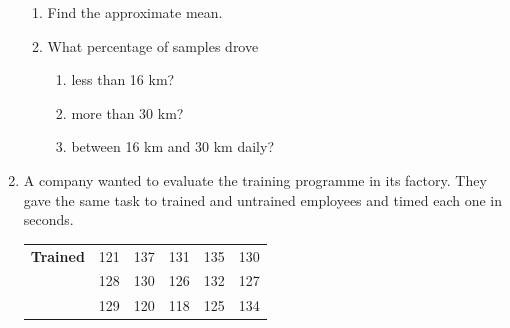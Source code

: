 \begin{description}[noitemsep]
\begin{description}[noitemsep]
\begin{enumerate}[noitemsep, label=\textbf{\arabic*}. ]
\begin{table}[H]
\end{table}
    \par
  \label{m39404*id217956}\begin{enumerate}[noitemsep, label=\textbf{\alph*}. ] 
            \label{m39404*uid142}\item Find the approximate mean.
\label{m39404*uid143}\item What percentage of samples drove
\label{m39404*id217984}\begin{enumerate}[noitemsep, label=\textbf{\roman*}. ] 
            \label{m39404*uid144}\item less than 16 km?
\label{m39404*uid145}\item more than 30 km?
\label{m39404*uid146}\item between 16 km and 30 km daily?
\end{enumerate}
        \end{enumerate}
                \label{m39404*uid147}\item A company wanted to evaluate the training programme in its factory. They gave the same task to trained and untrained employees and timed each one in seconds.
          \begin{table}[H]
        \begin{center}
      \label{m39404*id218040}
    \noindent
      \tablelasttail{}
      \begin{xtabular}[t]{|l|l|l|l|l|l|}\hline
        \textbf{Trained} &
        121 &
        137 &
        131 &
        135 &
        130%
     \tabularnewline{}
         &
        128 &
        130 &
        126 &
        132 &
        127%
     \tabularnewline{}
         &
        129 &
        120 &
        118 &
        125 &
        134%
     \tabularnewline{}

\end{xtabular}
\end{center}
\end{table}
\end{enumerate}
\end{description}
\end{description}
